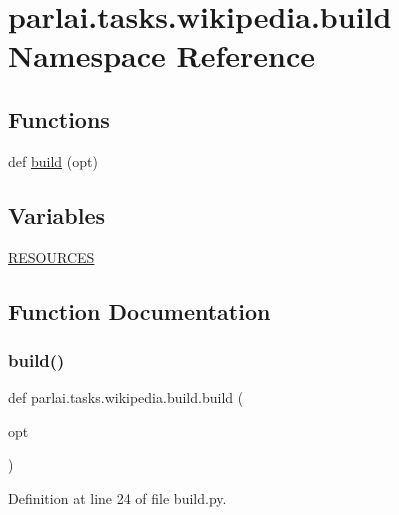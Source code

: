 \hypertarget{namespaceparlai_1_1tasks_1_1wikipedia_1_1build}{}\section{parlai.\+tasks.\+wikipedia.\+build Namespace Reference}
\label{namespaceparlai_1_1tasks_1_1wikipedia_1_1build}
\subsection*{Functions}
\begin{DoxyCompactItemize}
\item 
def \hyperlink{namespaceparlai_1_1tasks_1_1wikipedia_1_1build_acde71d9e655ae07210227d5bf00e77a0}{build} (opt)
\end{DoxyCompactItemize}
\subsection*{Variables}
\begin{DoxyCompactItemize}
\item 
\hyperlink{namespaceparlai_1_1tasks_1_1wikipedia_1_1build_a472bb7e75c19f0b2d1969fca17a86669}{R\+E\+S\+O\+U\+R\+C\+ES}
\end{DoxyCompactItemize}


\subsection{Function Documentation}
\mbox{\label{namespaceparlai_1_1tasks_1_1wikipedia_1_1build_acde71d9e655ae07210227d5bf00e77a0}} 
\subsubsection{\texorpdfstring{build()}{build()}}
{\footnotesize\ttfamily def parlai.\+tasks.\+wikipedia.\+build.\+build (\begin{DoxyParamCaption}\item[{}]{opt }\end{DoxyParamCaption})}



Definition at line 24 of file build.\+py.


